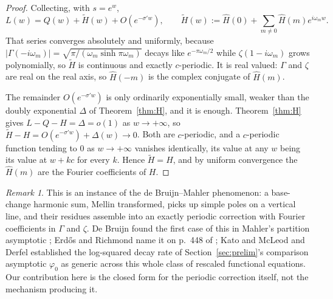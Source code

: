 \documentclass[11pt]{amsart}
\theoremstyle{plain}
\theoremstyle{definition}
\theoremstyle{remark}
\newtheorem{remark}[theorem]{Remark}
\begin{document}
\begin{proof}
Collecting, with $s=e^w$,
\[
L(w) = Q(w)+\widetilde H(w)+O(e^{-\sigma' w}), \qquad
\widetilde H(w) := \hat H(0)+\sum_{m\ne0}\hat H(m)e^{i\omega_m w}.
\]
That series converges absolutely and uniformly, because $|\Gamma(-i\omega_m)| =
\sqrt{\pi/(\omega_m\sinh\pi\omega_m)}$ decays like $e^{-\pi\omega_m/2}$ while $\zeta(1-i\omega_m)$
grows polynomially, so $\widetilde H$ is continuous and exactly $c$-periodic. It is real valued:
$\Gamma$ and $\zeta$ are real on the real axis, so $\hat H(-m)$ is the complex conjugate of
$\hat H(m)$.

The remainder $O(e^{-\sigma'w})$ is only ordinarily exponentially small, weaker than the doubly
exponential $\Delta$ of Theorem~\ref{thm:H}, and it is enough. Theorem~\ref{thm:H} gives
$L-Q-H=\Delta=o(1)$ as $w\to+\infty$, so $\widetilde H-H = O(e^{-\sigma'w})+\Delta(w)\to0$. Both are
$c$-periodic, and a $c$-periodic function tending to $0$ as $w\to+\infty$ vanishes identically, its
value at any $w$ being its value at $w+kc$ for every $k$. Hence $\widetilde H=H$, and by uniform
convergence the $\hat H(m)$ are the Fourier coefficients of $H$.
\end{proof}

\begin{remark}
This is an instance of the de Bruijn--Mahler phenomenon: a base-change harmonic sum, Mellin
transformed, picks up simple poles on a vertical line, and their residues assemble into an exactly
periodic correction with Fourier coefficients in $\Gamma$ and $\zeta$. De Bruijn found the first
case of this in Mahler's partition asymptotic \cite{debruijn1948}; Erd\H{o}s and Richmond name it
on p.~448 of \cite{erdosrichmond1976}; Kato and McLeod \cite{katomcleod1971} and Derfel
\cite{derfel1995} established the log-squared decay rate of Section~\ref{sec:prelim}'s
comparison asymptotic $\varphi_0$ as generic across this whole class of rescaled functional
equations. Our contribution here is the closed form for the periodic correction itself, not the mechanism
producing it.
\end{remark}
\end{document}
